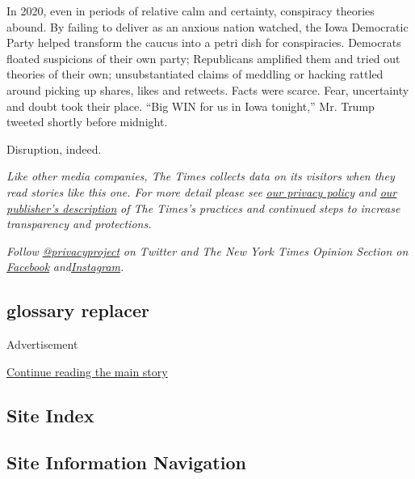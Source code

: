 In 2020, even in periods of relative calm and certainty, conspiracy
theories abound. By failing to deliver as an anxious nation watched, the
Iowa Democratic Party helped transform the caucus into a petri dish for
conspiracies. Democrats floated suspicions of their own party;
Republicans amplified them and tried out theories of their own;
unsubstantiated claims of meddling or hacking rattled around picking up
shares, likes and retweets. Facts were scarce. Fear, uncertainty and
doubt took their place. ``Big WIN for us in Iowa tonight,'' Mr. Trump
tweeted shortly before midnight.

Disruption, indeed.

\emph{Like other media companies, The Times collects data on its
visitors when they read stories like this one. For more detail please
see}
\href{https://help.nytimes.com/hc/en-us/articles/115014892108-Privacy-policy?module=inline}{\emph{our
privacy policy}} \emph{and}
\href{https://www.nytimes.com/2019/04/10/opinion/sulzberger-new-york-times-privacy.html?rref=collection\%2Fspotlightcollection\%2Fprivacy-project-does-privacy-matter\&action=click\&contentCollection=opinion\&region=stream\&module=stream_unit\&version=latest\&contentPlacement=8\&pgtype=collection}{\emph{our
publisher's description}} \emph{of The Times's practices and continued
steps to increase transparency and protections.}

\emph{Follow}
\href{https://twitter.com/privacyproject}{\emph{@privacyproject}}
\emph{on Twitter and The New York Times Opinion Section on}
\href{https://www.facebook.com/nytopinion}{\emph{Facebook}}
\emph{and}\href{https://www.instagram.com/nytopinion/}{\emph{Instagram}}\emph{.}

\hypertarget{glossary-replacer}{%
\subsection{glossary replacer}\label{glossary-replacer}}

Advertisement

\protect\hyperlink{after-bottom}{Continue reading the main story}

\hypertarget{site-index}{%
\subsection{Site Index}\label{site-index}}

\hypertarget{site-information-navigation}{%
\subsection{Site Information
Navigation}\label{site-information-navigation}}

